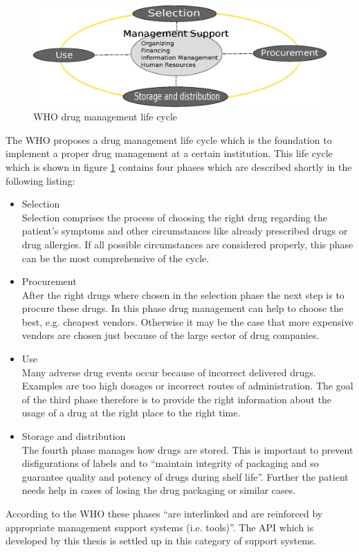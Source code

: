 \begin{figure}
  \centering
  \includegraphics[width=\textwidth]{preliminaries/life_cycle.eps}
  \caption{WHO drug management life cycle}
  \label{fig:life_cycle}
\end{figure}
The WHO proposes a drug management life cycle which is the foundation to implement a proper drug management at a certain institution.
This life cycle which is shown in figure \ref{fig:life_cycle} contains four phases which are described shortly in the following listing:
\begin{itemize}
\item Selection\\
  Selection comprises the process of choosing the right drug regarding the patient's symptoms and other circumstances like already prescribed drugs or drug allergies.
  If all possible circumstances are considered properly, this phase can be the most comprehensive of the cycle.
\item Procurement\\
  After the right drugs where chosen in the selection phase the next step is to procure these drugs.
  In this phase drug management can help to choose the best, e.g. cheapest vendors.
  Otherwise it may be the case that more expensive vendors are chosen just because of the large sector of drug companies.
\item Use\\
  Many adverse drug events occur because of incorrect delivered drugs.
  Examples are too high dosages or incorrect routes of administration.
  The goal of the third phase therefore is to provide the right information about the usage of a drug at the right place to the right time.
\item Storage and distribution\\
  The fourth phase manages how drugs are stored.
  This is important to prevent disfigurations of labels and to ``maintain integrity of packaging and so guarantee quality and potency of drugs during shelf life''.
  Further the patient needs help in cases of losing the drug packaging or similar cases.
\end{itemize}
According to the WHO these phases ``are interlinked and are reinforced by appropriate management support systems (i.e. tools)''.
The API which is developed by this thesis is settled up in this category of support systems.


